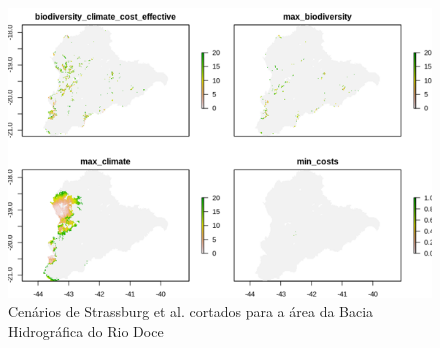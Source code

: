 \documentclass{article}
\begin{document}
\begin{figure}
    \centering
    \includegraphics[scale=0.7]{figs/scenarios_BHRD.png}
    \caption{Cenários de Strassburg et al. \cite{Strassburg2019} cortados para a área da Bacia Hidrográfica do Rio Doce}
    \label{fig:scenarios_BHRD}
\end{figure}


\printbibliography
\end{document}

